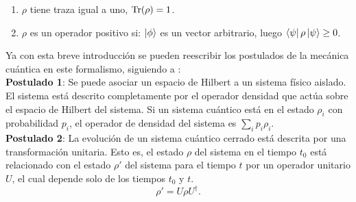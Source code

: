 \begin{enumerate}
\item $\rho$ tiene traza igual a uno, $\Tr(\rho)=1$.

\item $\rho$ es un operador positivo si: $\ket{\phi}$ es un vector arbitrario, luego $\bra{\psi}\rho\ket{\psi} \geq 0$.
\end{enumerate}
Ya con esta breve introducción se pueden reescribir los postulados de la mecánica cuántica en este formalismo, siguiendo a \cite{NielsenInformation}:
\\
\textbf{Postulado 1}: Se puede asociar un espacio de Hilbert a un sistema físico aislado. El sistema está descrito completamente por el operador densidad que actúa sobre el espacio de Hilbert del sistema. Si un sistema cuántico está en el estado $\rho_{i}$ con probabilidad $p_{i}$, el operador de densidad del sistema es $\sum_{i} p_{i} \rho_{i}$.
\\

\textbf{Postulado 2}: La evolución de un sistema cuántico cerrado está descrita por una transformación unitaria. Esto es, el estado $\rho$ del sistema en el tiempo $t_{0}$ está relacionado con el estado $\rho'$ del sistema para el tiempo $t$ por un operador unitario $U$, el cual depende solo de los tiempos $t_{0}$ y $t$. 
\begin{equation}
\rho' = U \rho U^{\dagger}.
\end{equation}
\\

